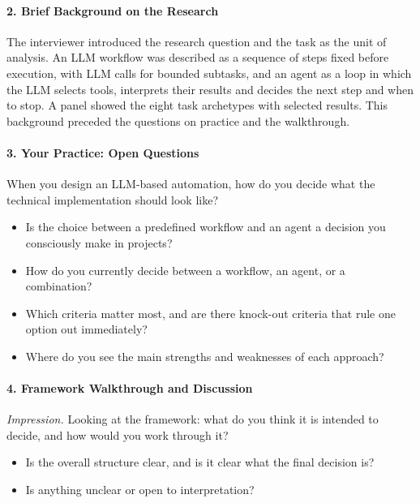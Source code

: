\paragraph*{2. Brief Background on the Research}
The interviewer introduced the research question and the task as the unit of analysis. An LLM workflow was described as a sequence of steps fixed before execution, with LLM calls for bounded subtasks, and an agent as a loop in which the LLM selects tools, interprets their results and decides the next step and when to stop. A panel showed the eight task archetypes with selected results. This background preceded the questions on practice and the walkthrough.

\paragraph*{3. Your Practice: Open Questions}
When you design an LLM-based automation, how do you decide what the technical implementation should look like?
\begin{itemize}
    \item Is the choice between a predefined workflow and an agent a decision you consciously make in projects?
    \item How do you currently decide between a workflow, an agent, or a combination?
    \item Which criteria matter most, and are there knock-out criteria that rule one option out immediately?
    \item Where do you see the main strengths and weaknesses of each approach?
\end{itemize}

\paragraph*{4. Framework Walkthrough and Discussion}
\textit{Impression.} Looking at the framework: what do you think it is intended to decide, and how would you work through it?
\begin{itemize}
    \item Is the overall structure clear, and is it clear what the final decision is?
    \item Is anything unclear or open to interpretation?
\end{itemize}

